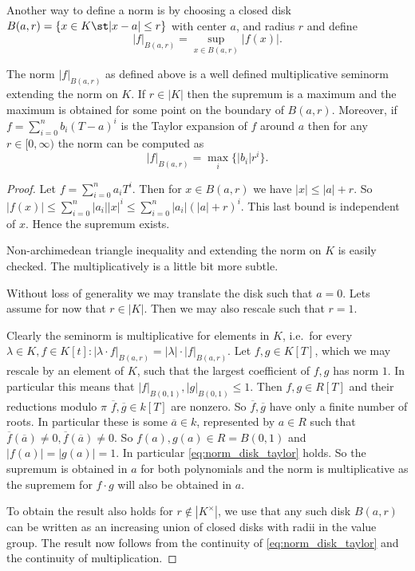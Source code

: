 Another way to define a norm is by choosing a closed disk $B(a, r) = \{x \in K \st |x - a| \le r\} $ with center $a$, and radius $r$ and define \[
	|f|_{B(a, r)} = \sup_{x \in B(a, r)} |f(x)|
.\] 
\begin{claim}
	The norm $|f|_{B(a, r)}$ as defined above is a well defined multiplicative seminorm extending the norm on $K$. 
	If $r \in |K|$ then the supremum is a maximum and the maximum is obtained for some point on the boundary of $B(a, r)$.
	Moreover, if  $f = \sum_{i = 0}^{n} b_i (T-a)^{i}$ is the Taylor expansion of $f$ around $a$ then for any $r \in [0, \infty)$ the norm can be computed as \begin{equation}\label{eq:norm_disk_taylor}
		|f|_{B(a, r)} = \max_{i}\{  |b_i|r^{i}\}
	.\end{equation} 
\end{claim}
\begin{proof}
	Let $f = \sum_{i = 0}^{n} a_i T^{i}$. 
	Then for $x \in B(a, r)$ we have $|x| \le |a| + r$. 
	So  $|f(x)| \le  \sum_{i = 0}^{n} |a_i| |x|^{i} \le \sum_{i = 0}^{n}|a_i| (|a| + r)^{i} $. 
	This last bound is independent of $x$. Hence the supremum exists. 

	Non-archimedean triangle inequality and extending the norm on $K$ is easily checked. 
	The multiplicatively is a little bit more subtle. 

	Without loss of generality we may translate the disk such that $a = 0$. 
	Lets assume for now that $r \in |K|$.
	Then we may also rescale such that $r = 1$. 

	Clearly the seminorm is multiplicative for elements in  $K$, i.e.\ for every $\lambda \in K, f \in K[t]: |\lambda \cdot f|_{B(a, r)} = |\lambda|\cdot |f|_{B(a, r)}$.  Let $f, g \in K[T]$, which we may rescale by an element of $K$, such that the largest coefficient of $f, g$ has norm $1$. In particular this means that $|f|_{B(0,1)}, |g|_{B(0,1)} \le 1$. 
	Then $f, g \in R[T]$ and their  reductions modulo  $\pi$ $\overline{f}, \overline{g} \in k[T]$ are nonzero.
	So $\overline{f}, \overline{g}$ have only a finite number of roots. In particular these is some $\overline{a} \in k$, represented by $a \in R$ such that $\overline{f}(\overline{a}) \ne 0, \overline{f}(\overline{a})\ne 0$. 
	So $f(a), g(a) \in R = B(0, 1)$ and $|f(a)| = |g(a)| = 1$. 
	In particular \cref{eq:norm_disk_taylor} holds. 
	So the supremum is obtained in $a$ for both polynomials and the norm is multiplicative as the supremem for $f\cdot g$ will also be obtained in $a$. 


	To obtain the result also holds for $r \not\in |K^{\times }|$, we use that any such disk $B(a, r)$ can be written as an increasing union of closed disks with radii in the value group. The result now follows from the continuity of \cref{eq:norm_disk_taylor} and the continuity of multiplication. 
\end{proof}



